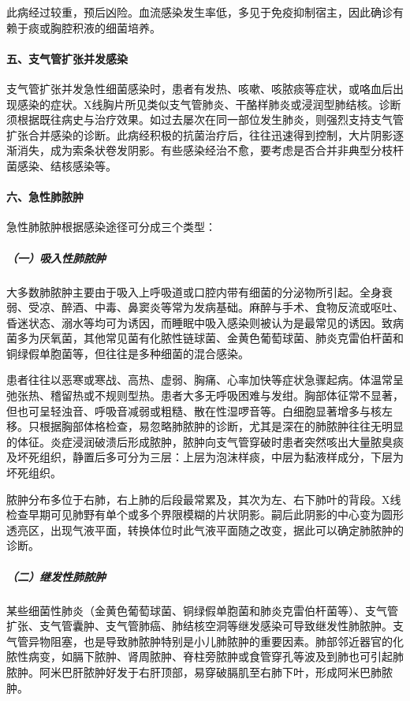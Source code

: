 此病经过较重，预后凶险。血流感染发生率低，多见于免疫抑制宿主，因此确诊有赖于痰或胸腔积液的细菌培养。

\paragraph{五、支气管扩张并发感染}

支气管扩张并发急性细菌感染时，患者有发热、咳嗽、咳脓痰等症状，或咯血后出现感染的症状。X线胸片所见类似支气管肺炎、干酪样肺炎或浸润型肺结核。诊断须根据既往病史与治疗效果。如过去屡次在同一部位发生肺炎，则强烈支持支气管扩张合并感染的诊断。此病经积极的抗菌治疗后，往往迅速得到控制，大片阴影逐渐消失，成为索条状卷发阴影。有些感染经治不愈，要考虑是否合并非典型分枝杆菌感染、结核感染等。

\paragraph{六、急性肺脓肿}

急性肺脓肿根据感染途径可分成三个类型：

\subparagraph{（一）吸入性肺脓肿}

大多数肺脓肿主要由于吸入上呼吸道或口腔内带有细菌的分泌物所引起。全身衰弱、受凉、醉酒、中毒、鼻窦炎等常为发病基础。麻醉与手术、食物反流或呕吐、昏迷状态、溺水等均可为诱因，而睡眠中吸入感染则被认为是最常见的诱因。致病菌多为厌氧菌，其他常见菌有化脓性链球菌、金黄色葡萄球菌、肺炎克雷伯杆菌和铜绿假单胞菌等，但往往是多种细菌的混合感染。

患者往往以恶寒或寒战、高热、虚弱、胸痛、心率加快等症状急骤起病。体温常呈弛张热、稽留热或不规则型热。患者大多无呼吸困难与发绀。胸部体征常不显著，但也可呈轻浊音、呼吸音减弱或粗糙、散在性湿啰音等。白细胞显著增多与核左移。只根据胸部体格检查，易忽略肺脓肿的诊断，尤其是深在的肺脓肿往往无明显的体征。炎症浸润破溃后形成脓肿，脓肿向支气管穿破时患者突然咳出大量脓臭痰及坏死组织，静置后多可分为三层：上层为泡沫样痰，中层为黏液样成分，下层为坏死组织。

脓肿分布多位于右肺，右上肺的后段最常累及，其次为左、右下肺叶的背段。X线检查早期可见肺野有单个或多个界限模糊的片状阴影。嗣后此阴影的中心变为圆形透亮区，出现气液平面，转换体位时此气液平面随之改变，据此可以确定肺脓肿的诊断。

\subparagraph{（二）继发性肺脓肿}

某些细菌性肺炎（金黄色葡萄球菌、铜绿假单胞菌和肺炎克雷伯杆菌等）、支气管扩张、支气管囊肿、支气管肺癌、肺结核空洞等继发感染可导致继发性肺脓肿。支气管异物阻塞，也是导致肺脓肿特别是小儿肺脓肿的重要因素。肺部邻近器官的化脓性病变，如膈下脓肿、肾周脓肿、脊柱旁脓肿或食管穿孔等波及到肺也可引起肺脓肿。阿米巴肝脓肿好发于右肝顶部，易穿破膈肌至右肺下叶，形成阿米巴肺脓肿。

